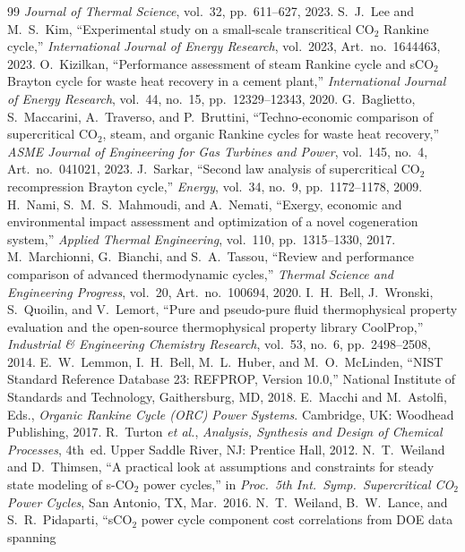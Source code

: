 \begin{thebibliography}{99}
\textit{Journal of Thermal Science}, vol.~32, pp.~611--627, 2023.
S.~J.~Lee and M.~S.~Kim,
``Experimental study on a small-scale transcritical CO$_2$ Rankine cycle,''
\textit{International Journal of Energy Research},
vol.~2023, Art.\ no.~1644463, 2023.
O.~Kizilkan,
``Performance assessment of steam Rankine cycle and sCO$_2$ Brayton cycle
for waste heat recovery in a cement plant,''
\textit{International Journal of Energy Research},
vol.~44, no.~15, pp.~12329--12343, 2020.
G.~Baglietto, S.~Maccarini, A.~Traverso, and P.~Bruttini,
``Techno-economic comparison of supercritical CO$_2$, steam, and organic
Rankine cycles for waste heat recovery,''
\textit{ASME Journal of Engineering for Gas Turbines and Power},
vol.~145, no.~4, Art.\ no.~041021, 2023.
J.~Sarkar,
``Second law analysis of supercritical CO$_2$ recompression Brayton cycle,''
\textit{Energy}, vol.~34, no.~9, pp.~1172--1178, 2009.
H.~Nami, S.~M.~S.~Mahmoudi, and A.~Nemati,
``Exergy, economic and environmental impact assessment and optimization
of a novel cogeneration system,''
\textit{Applied Thermal Engineering}, vol.~110, pp.~1315--1330, 2017.
M.~Marchionni, G.~Bianchi, and S.~A.~Tassou,
``Review and performance comparison of advanced thermodynamic cycles,''
\textit{Thermal Science and Engineering Progress},
vol.~20, Art.\ no.~100694, 2020.
I.~H.~Bell, J.~Wronski, S.~Quoilin, and V.~Lemort,
``Pure and pseudo-pure fluid thermophysical property evaluation and the
open-source thermophysical property library CoolProp,''
\textit{Industrial \& Engineering Chemistry Research},
vol.~53, no.~6, pp.~2498--2508, 2014.
E.~W.~Lemmon, I.~H.~Bell, M.~L.~Huber, and M.~O.~McLinden,
``NIST Standard Reference Database 23: REFPROP, Version 10.0,''
National Institute of Standards and Technology, Gaithersburg, MD, 2018.
E.~Macchi and M.~Astolfi, Eds.,
\textit{Organic Rankine Cycle (ORC) Power Systems}.
Cambridge, UK: Woodhead Publishing, 2017.
R.~Turton \textit{et al.},
\textit{Analysis, Synthesis and Design of Chemical Processes}, 4th~ed.
Upper Saddle River, NJ: Prentice Hall, 2012.
N.~T.~Weiland and D.~Thimsen,
``A practical look at assumptions and constraints for steady state modeling
of s-CO$_2$ power cycles,''
in \textit{Proc.\ 5th Int.\ Symp.\ Supercritical CO$_2$ Power Cycles},
San Antonio, TX, Mar.\ 2016.
N.~T.~Weiland, B.~W.~Lance, and S.~R.~Pidaparti,
``sCO$_2$ power cycle component cost correlations from DOE data spanning

\end{thebibliography}
